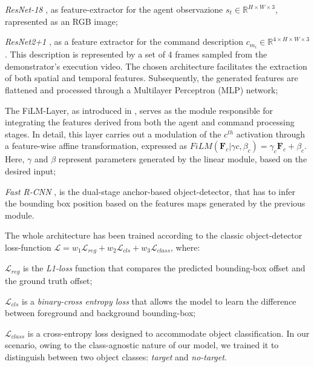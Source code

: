 \begin{itemize*}[label=$(\bullet)$]
    \item \textit{ResNet-18} \cite{resnet}, as feature-extractor for the agent observazione $s_{t} \in \mathbb{R}^{H \times W \times 3}$, rapresented as an RGB image;
    \item \textit{ResNet2+1} \cite{resnet21},  as a feature extractor for the command description $c_{m_{i}} \in \mathbb{R}^{4 \times H \times W \times 3}$. This description is represented by a set of 4 frames sampled from the demonstrator's execution video. The chosen architecture facilitates the extraction of both spatial and temporal features. Subsequently, the generated features are flattened and processed through a Multilayer Perceptron (MLP) network;
    \item The FiLM-Layer, as introduced in \cite{perez2018film}, serves as the module responsible for integrating the features derived from both the agent and command processing stages. In detail, this layer carries out a modulation of the $c^{th}$ activation through a feature-wise affine transformation, expressed as $FiLM(\textbf{F}_{c}|\gamma{c}, \beta_{c}) = \gamma_{c} \textbf{F}_{c} + \beta_{c}$. Here, $\gamma$ and $\beta$ represent parameters generated by the linear module, based on the desired input;
    \item \textit{Fast R-CNN} \cite{fastrcnn}, is the dual-stage anchor-based object-detector, that has to infer the bounding box position based on the features maps generated by the previous module.
\end{itemize*}
The whole architecture has been trained according to the classic object-detector loss-function $\mathcal{L} = w_{1}\mathcal{L}_{reg} + w_{2}\mathcal{L}_{cls} + w_{3}\mathcal{L}_{class}$, where: \begin{itemize*}[label=$(\bullet)$]
    \item $\mathcal{L}_{reg}$ is the \textit{L1-loss} function that compares the predicted bounding-box offset and the ground truth offset;
    \item $\mathcal{L}_{cls}$ is a \textit{binary-cross entropy loss} that allows the model to learn the difference between foreground and background bounding-box;
    \item $\mathcal{L}_{class}$ is a cross-entropy loss designed to accommodate object classification. In our scenario, owing to the class-agnostic nature of our model, we trained it to distinguish between two object classes: \textit{target} and \textit{no-target}.
\end{itemize*}


